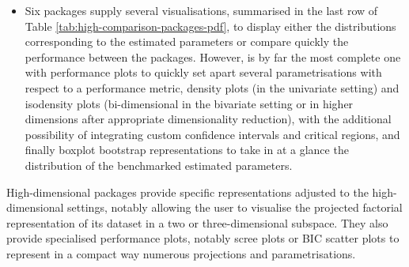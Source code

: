 \begin{itemize}
\tightlist
\item
  Six packages supply several visualisations, summarised in the last row of Table \ref{tab:high-comparison-packages-pdf}, to display either the distributions corresponding to the estimated parameters or compare quickly the performance between the packages. However,  is by far the most complete one with performance plots to quickly set apart several parametrisations with respect to a performance metric, density plots (in the univariate setting) and isodensity plots (bi-dimensional in the bivariate setting or in higher dimensions after appropriate dimensionality reduction), with the additional possibility of integrating custom confidence intervals and critical regions, and finally boxplot bootstrap representations to take in at a glance the distribution of the benchmarked estimated parameters.
\end{itemize}

High-dimensional packages provide specific representations adjusted to the high-dimensional settings, notably allowing the user to visualise the projected factorial representation of its dataset in a two or three-dimensional subspace. They also provide specialised performance plots, notably scree plots or BIC scatter plots to represent in a compact way numerous projections and parametrisations.

